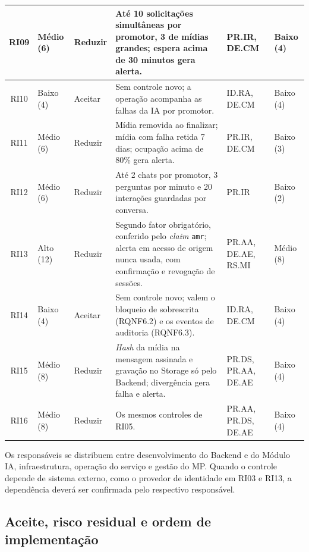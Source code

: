 \documentclass[12pt]{article}
\begin{document}
\begin{table}[htbp]
\begin{tabular}{|c|p{1.5cm}|p{1.5cm}|p{5.7cm}|p{1.9cm}|p{1.5cm}|}
            \hline
            RI09 & Médio (6) & Reduzir & Até 10 solicitações simultâneas por promotor, 3 de mídias grandes; espera acima de 30 minutos gera alerta. & PR.IR, DE.CM & Baixo (4) \\
            \hline
            RI10 & Baixo (4) & Aceitar & Sem controle novo; a operação acompanha as falhas da IA por promotor. & ID.RA, DE.CM & Baixo (4) \\
            \hline
            RI11 & Médio (6) & Reduzir & Mídia removida ao finalizar; mídia com falha retida 7 dias; ocupação acima de 80\% gera alerta. & PR.IR, DE.CM & Baixo (3) \\
            \hline
            RI12 & Médio (6) & Reduzir & Até 2 chats por promotor, 3 perguntas por minuto e 20 interações guardadas por conversa. & PR.IR & Baixo (2) \\
            \hline
            RI13 & Alto (12) & Reduzir & Segundo fator obrigatório, conferido pelo \textit{claim} \texttt{amr}; alerta em acesso de origem nunca usada, com confirmação e revogação de sessões. & PR.AA, DE.AE, RS.MI & Médio (8) \\
            \hline
            RI14 & Baixo (4) & Aceitar & Sem controle novo; valem o bloqueio de sobrescrita (RQNF6.2) e os eventos de auditoria (RQNF6.3). & ID.RA, DE.CM & Baixo (4) \\
            \hline
            RI15 & Médio (8) & Reduzir & \textit{Hash} da mídia na mensagem assinada e gravação no Storage só pelo Backend; divergência gera falha e alerta. & PR.DS, PR.AA, DE.AE & Baixo (4) \\
            \hline
            RI16 & Médio (8) & Reduzir & Os mesmos controles de RI05. & PR.AA, PR.DS, DE.AE & Baixo (4) \\
            \hline
        \end{tabular}
    \end{table}

    Os responsáveis se distribuem entre desenvolvimento do Backend e do Módulo IA, infraestrutura, operação do serviço e gestão do MP. Quando o controle depende de sistema externo, como o provedor de identidade em RI03 e RI13, a dependência deverá ser confirmada pelo respectivo responsável.

    \subsection{Aceite, risco residual e ordem de implementação}
\end{document}

